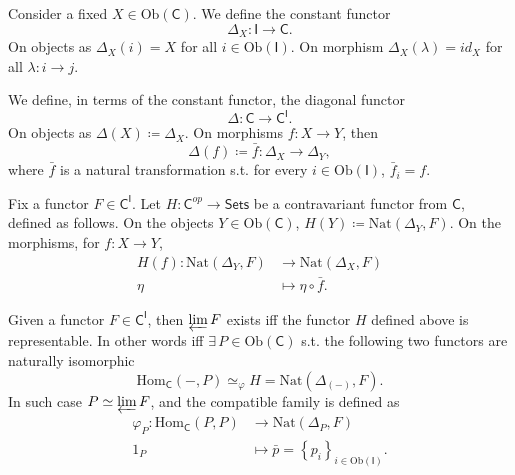 \begin{defn}
	Consider a fixed $X \in \mathrm{Ob} \left(\mathsf{C}\right)$.
	We define the constant functor
	\begin{equation}
	\Delta_X\colon \mathsf{I} \to \mathsf{C}
	.\end{equation} 
	On objects as $\Delta_X(i) = X$ for all $i \in \mathrm{Ob} \left(\mathsf{I}\right)$.
	On morphism $\Delta_X(\lambda) = id_X$ for all $\lambda\colon i \to j$.
\end{defn}

\begin{defn}
	We define, in terms of the constant functor, the diagonal functor
	 \begin{equation}
	\Delta\colon \mathsf{C} \to \mathsf{C}^{\mathsf{I}}
	.\end{equation} 
	On objects as $\Delta(X) \coloneqq \Delta_X$.
	On morphisms $f\colon X \to Y$, then
	\begin{equation}
		\Delta(f) \coloneqq \bar{f}\colon \Delta_X \to \Delta_Y
	,\end{equation} 
	where $\bar{f}$ is a natural transformation s.t. for every $i \in \mathrm{Ob} \left(\mathsf{I}\right)$, $\bar{f}_i = f$.
\end{defn}

\begin{defn}
	Fix a functor $F \in \mathsf{C}^{\mathsf{I}}$.
	Let $H\colon \mathsf{C}^{op} \to \mathsf{Sets}$ be a contravariant functor from $\mathsf{C}$, defined as follows.
	On the objects $Y \in \mathrm{Ob} \left(\mathsf{C}\right)$, 
	$H(Y) \coloneqq \mathrm{Nat} \left( \Delta_Y, F \right)$.
	On the morphisms, for $f\colon X \to Y$, 
	 \begin{align}
		 H(f)\colon \mathrm{Nat} \left( \Delta_Y, F \right) &\to \mathrm{Nat} \left( \Delta_X, F \right) \\
		 \eta &\mapsto \eta \circ \bar{f}
	.\end{align} 
\end{defn}

\begin{prop}
	Given a functor $F \in \mathsf{C}^{\mathsf{I}}$, then
	$\varprojlim F$ exists iff the functor $H$ defined above is representable.
	In other words iff $\exists\, P \in \mathrm{Ob} \left(\mathsf{C}\right)$ s.t.
	the following two functors are naturally isomorphic
	\begin{equation}
	\mathrm{Hom}_{\mathsf{C}} \left( -, P \right) \simeq_{\varphi} H =
	\mathrm{Nat} \left( \Delta_{(-)}, F \right)
	.\end{equation} 
	In such case $P \simeq \varprojlim F$, and the compatible family is defined as
	\begin{align}
		\varphi_P\colon \mathrm{Hom}_{\mathsf{C}} \left( P, P \right) &\to
		\mathrm{Nat} \left( \Delta_P, F \right) \\
		1_P &\mapsto \bar{p} = \left\{ p_i \right\}_{i \in \mathrm{Ob} \left(\mathsf{I}\right)}
	.\end{align} 
\end{prop} 

